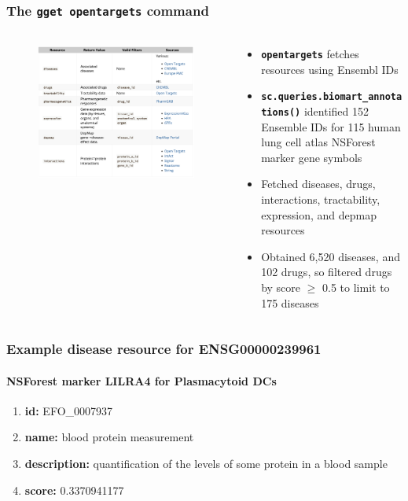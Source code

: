 \documentclass[aspectratio=169,xcolor=dvipsnames]{beamer}
\begin{document}
\begin{frame}
  \frametitle{The \texttt{\textbf{gget opentargets}} command}
  \framesubtitle{}
  \begin{columns}
    \begin{column}{0.4\textwidth}
      \begin{figure}
        \includegraphics[width=\textwidth]{gget-opentargets-resources.png}
      \end{figure}
    \end{column}
    \begin{column}{0.6\textwidth}
      \begin{itemize}
      \item \texttt{\textbf{opentargets}} fetches resources using
        Ensembl IDs
      \item \texttt{\textbf{sc.queries.biomart\_annotations()}}
        identified 152 Ensemble IDs for 115 human lung cell atlas
        NSForest marker gene symbols
      \item Fetched diseases, drugs, interactions, tractability,
        expression, and depmap resources
      \item Obtained 6,520 diseases, and 102 drugs, so filtered drugs
        by score $\ge$ 0.5 to limit to 175 diseases
      \end{itemize}
    \end{column}
  \end{columns}
\end{frame}

\begin{frame}
  \frametitle{Example \textbf{disease} resource for ENSG00000239961}
  \framesubtitle{NSForest marker LILRA4 for Plasmacytoid DCs}
  \begin{enumerate}\footnotesize
  \item[]\textbf{id:} EFO\_0007937
  \item[]\textbf{name:} blood protein measurement
  \item[]\textbf{description:} quantification of the levels of some
    protein in a blood sample
  \item[]\textbf{score:} 0.3370941177
  \end{enumerate}
\end{frame}
\end{document}
